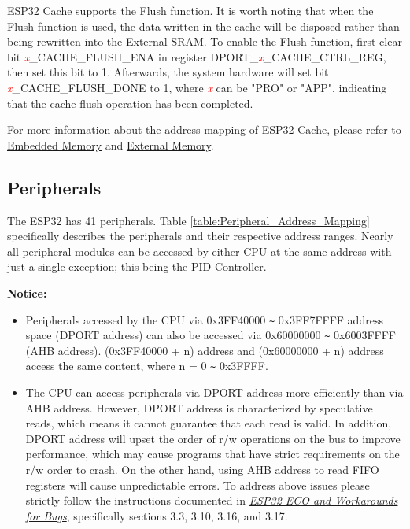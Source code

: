 \documentclass[main\_\_EN.tex]{subfiles}
\begin{document}
ESP32 Cache supports the Flush function. It is worth noting that when the Flush function is used, the data written in the cache will be disposed rather than being rewritten into the External SRAM. To enable the Flush function,  first clear bit \textcolor{red}{\it{x}}\_CACHE\_FLUSH\_ENA in register DPORT\_\textcolor{red}{\it{x}}\_CACHE\_CTRL\_REG, then set this bit to 1. Afterwards, the system hardware will set bit \textcolor{red}{\it{x}}\_CACHE\_FLUSH\_DONE to 1, where \textcolor{red}{\it{x}} can be "PRO" or "APP", indicating that the cache flush operation has been completed.

For more information about the address mapping of ESP32 Cache, please refer to \hyperref[para:embedded memory]{Embedded Memory} and \hyperref[para:external_Memory]{External Memory}.


\subsection{Peripherals}

The ESP32 has 41 peripherals. Table \ref{table:Peripheral_Address_Mapping} specifically describes the peripherals and their respective address ranges. Nearly all peripheral modules can be accessed by either CPU at the same address with just a single exception; this being the PID Controller.



{\bfseries Notice:}
\begin{itemize}
    \item Peripherals accessed by the CPU via 0x3FF40000 \verb+~+ 0x3FF7FFFF address space (DPORT address) can also be accessed via 0x60000000 \verb+~+ 0x6003FFFF (AHB address). (0x3FF40000 + n) address and (0x60000000 + n) address access the same content, where n = 0 \verb+~+ 0x3FFFF.

    \item The CPU can access peripherals via DPORT address more efficiently than via AHB address. However, DPORT address is characterized by speculative reads, which means it cannot guarantee that each read is valid. In addition, DPORT address will upset the order of r/w operations on the bus to improve performance, which may cause programs that have strict requirements on the r/w order to crash. On the other hand, using AHB address to read FIFO registers will cause unpredictable errors. To address above issues please strictly follow the instructions documented in \href{https://www.espressif.com/sites/default/files/documentation/eco_and_workarounds_for_bugs_in_esp32_en.pdf}{\it{ESP32 ECO and Workarounds for Bugs}}, specifically sections 3.3, 3.10, 3.16, and 3.17.
\end{itemize}
\end{document}
